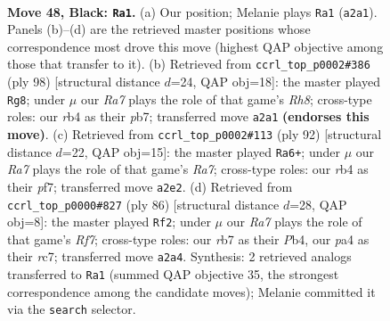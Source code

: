 \documentclass[11pt]{article}
\begin{document}
\clearpage

\begin{figure}[p]\centering
\begin{subfigure}{0.46\textwidth}\centering
\resizebox{\linewidth}{!}{%
\newchessgame
\chessboard[
  setfen={8/1R3p2/p3pk2/8/PR2P3/5PKP/r7/8 b - - 3 48},
  showmover=false,
  pgfstyle=straightmove, color=movearrow, markmove={a2-a1}
]}
\caption{}
\end{subfigure}\hfill
\begin{subfigure}{0.46\textwidth}\centering
\resizebox{\linewidth}{!}{%
\newchessgame
\chessboard[
  setfen={7R/1p3r1p/1P2k1p1/4p3/6PP/4KP2/8/8 w - - 11 50},
  showmover=false,
  pgfstyle=straightmove, color=movearrow, markmove={h8-g8}
]}
\caption{}
\end{subfigure}
\\[4pt]
\begin{subfigure}{0.46\textwidth}\centering
\resizebox{\linewidth}{!}{%
\newchessgame
\chessboard[
  setfen={8/R4p2/6k1/p4r1p/5P2/6PK/7P/8 w - - 2 47},
  showmover=false,
  pgfstyle=straightmove, color=movearrow, markmove={a7-a6}
]}
\caption{}
\end{subfigure}\hfill
\begin{subfigure}{0.46\textwidth}\centering
\resizebox{\linewidth}{!}{%
\newchessgame
\chessboard[
  setfen={3R4/2r2R2/p1r4p/1p2k3/1P6/P7/1KP5/8 w - - 8 44},
  showmover=false,
  pgfstyle=straightmove, color=movearrow, markmove={f7-f2}
]}
\caption{}
\end{subfigure}
\caption{\textbf{Move 48, Black: \texttt{Ra1}.} (a) Our position; Melanie plays \texttt{Ra1} (\texttt{a2a1}). Panels (b)--(d) are the retrieved master positions whose correspondence most drove this move (highest QAP objective among those that transfer to it). (b) Retrieved from \texttt{ccrl\_top\_p0002\#386} (ply 98) [structural distance $d$=24, QAP obj=18]: the master played \texttt{Rg8}; under $\mu$ our \emph{Ra7} plays the role of that game's \emph{Rh8}; cross-type roles: our \emph{r}b4 as their \emph{p}b7; transferred move \texttt{a2a1} \textbf{(endorses this move)}. (c) Retrieved from \texttt{ccrl\_top\_p0002\#113} (ply 92) [structural distance $d$=22, QAP obj=15]: the master played \texttt{Ra6+}; under $\mu$ our \emph{Ra7} plays the role of that game's \emph{Ra7}; cross-type roles: our \emph{r}b4 as their \emph{p}f7; transferred move \texttt{a2e2}. (d) Retrieved from \texttt{ccrl\_top\_p0000\#827} (ply 86) [structural distance $d$=28, QAP obj=8]: the master played \texttt{Rf2}; under $\mu$ our \emph{Ra7} plays the role of that game's \emph{Rf7}; cross-type roles: our \emph{r}b7 as their \emph{P}b4, our \emph{p}a4 as their \emph{r}c7; transferred move \texttt{a2a4}. Synthesis: 2 retrieved analogs transferred to \texttt{Ra1} (summed QAP objective 35, the strongest correspondence among the candidate moves); Melanie committed it via the \texttt{search} selector.}
\label{fig:thought-m95}
\end{figure}
\end{document}
